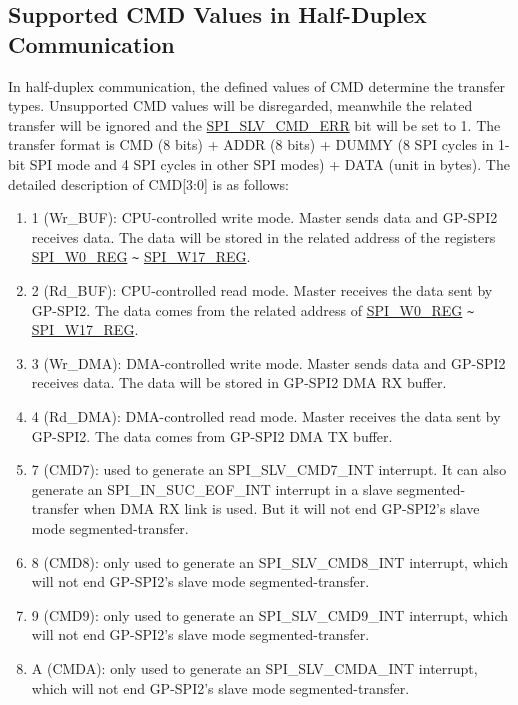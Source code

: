 \documentclass[main\_\_EN.tex]{subfiles}
\begin{document}
\subsection{Supported CMD Values in Half-Duplex Communication} \label{GP-SPI2 HD salve format}

In half-duplex communication, the defined values of CMD determine the transfer types. Unsupported CMD values will be disregarded, meanwhile the related transfer will be ignored and the \hyperref[fielddesc:SPISLVCMDERR]{SPI\_SLV\_CMD\_ERR} bit will be set to 1. The transfer format is CMD (8 bits) + ADDR (8 bits) + DUMMY (8 SPI cycles in 1-bit SPI mode and 4 SPI cycles in other SPI modes) + DATA (unit in bytes). The detailed description of CMD[3:0] is as follows:

\begin{enumerate}
    \item \hexprefix{}1 (Wr\_BUF): CPU-controlled write mode. Master sends data and GP-SPI2 receives data. The data will be stored in the related address of the registers \hyperref[regdesc:SPIW0REG]{SPI\_W0\_REG} \verb+~+ \hyperref[regdesc:SPIW17REG]{SPI\_W17\_REG}.

    \item \hexprefix{}2 (Rd\_BUF): CPU-controlled read mode. Master receives the data sent by GP-SPI2. The data comes from the related address of \hyperref[regdesc:SPIW0REG]{SPI\_W0\_REG} \verb+~+ \hyperref[regdesc:SPIW17REG]{SPI\_W17\_REG}.

    \item \hexprefix{}3 (Wr\_DMA): DMA-controlled write mode. Master sends data and GP-SPI2 receives data. The data will be stored in GP-SPI2 DMA RX buffer.

    \item \hexprefix{}4 (Rd\_DMA): DMA-controlled read mode. Master receives the data sent by GP-SPI2. The data comes from GP-SPI2 DMA TX buffer.

    \item \hexprefix{}7 (CMD7): used to generate an SPI\_SLV\_CMD7\_INT interrupt. It can also generate an SPI\_IN\_SUC\_EOF\_INT interrupt in a slave segmented-transfer when DMA RX link is used. But it will not end GP-SPI2's slave mode segmented-transfer.

    \item \hexprefix{}8 (CMD8): only used to generate an SPI\_SLV\_CMD8\_INT interrupt, which will not end GP-SPI2's slave mode segmented-transfer.

    \item \hexprefix{}9 (CMD9): only used to generate an SPI\_SLV\_CMD9\_INT interrupt, which will not end GP-SPI2's slave mode segmented-transfer.

    \item \hexprefix{}A (CMDA): only used to generate an SPI\_SLV\_CMDA\_INT interrupt, which will not end GP-SPI2's slave mode segmented-transfer.

\end{enumerate}
\end{document}
